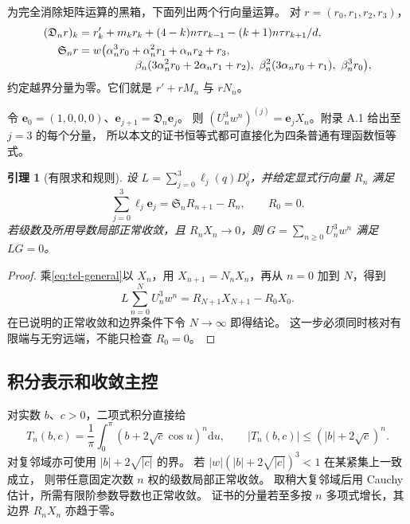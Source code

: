 \documentclass[11pt,a4paper]{article}
\numberwithin{equation}{section}
\newtheorem{lemma}[theorem]{引理}
\theoremstyle{remark}\newtheorem{remark}[theorem]{说明}
\newcommand{\dd}{\mathrm d}
\newcommand{\ee}{\boldsymbol e}
\newcommand{\Dop}{\mathfrak D}
\newcommand{\Sop}{\mathfrak S}
\begin{document}
为完全消除矩阵运算的黑箱，下面列出两个行向量运算。
对 $r=(r_0,r_1,r_2,r_3)$，
\begin{align}
 (\Dop_nr)_k&=r_k'+m_kr_k+(4-k)n\tau r_{k-1}
                    -(k+1)n\tau r_{k+1}/d,\label{eq:Drow}\\
 \Sop_nr&=w\bigl(\alpha_n^3r_0+\alpha_n^2r_1+\alpha_nr_2+r_3,\notag\\[-0.3em]
 &\hspace{18mm}\beta_n(3\alpha_n^2r_0+2\alpha_nr_1+r_2),\
 \beta_n^2(3\alpha_nr_0+r_1),\ \beta_n^3r_0\bigr),\label{eq:Srow}
\end{align}
约定越界分量为零。它们就是 $r'+rM_n$ 与 $rN_n$。

令 $\ee_0=(1,0,0,0)$、$\ee_{j+1}=\Dop_n\ee_j$。
则 $(U_n^3w^n)^{(j)}=\ee_jX_n$。附录 A.1 给出至 $j=3$ 的每个分量，
所以本文的证书恒等式都可直接化为四条普通有理函数恒等式。

\begin{lemma}[有限求和规则]\label{lem:tel}
设 $L=\sum_{j=0}^3\ell_j(q)D_q^j$，并给定显式行向量 $R_n$ 满足
\begin{equation}\label{eq:tel-general}
 \sum_{j=0}^3\ell_j\ee_j=\Sop_nR_{n+1}-R_n,\qquad R_0=0.
\end{equation}
若级数及所用导数局部正常收敛，且 $R_nX_n\to0$，则
$G=\sum_{n\ge0}U_n^3w^n$ 满足 $LG=0$。
\end{lemma}
\begin{proof}
乘\eqref{eq:tel-general}以 $X_n$，用 $X_{n+1}=N_nX_n$，再从 $n=0$ 加到 $N$，得到
\[
 L\sum_{n=0}^NU_n^3w^n=R_{N+1}X_{N+1}-R_0X_0.
\]
在已说明的正常收敛和边界条件下令 $N\to\infty$ 即得结论。
这一步必须同时核对有限端与无穷远端，不能只检查 $R_0=0$。
\end{proof}

\subsection{积分表示和收敛主控}
对实数 $b$、$c>0$，二项式积分直接给
\begin{equation}\label{eq:Uint}
 T_n(b,c)=\frac1\pi\int_0^\pi(b+2\sqrt c\cos u)^n\dd u,
 \qquad |T_n(b,c)|\le(|b|+2\sqrt c)^n.
\end{equation}
对复邻域亦可使用 $|b|+2\sqrt{|c|}$ 的界。
若 $|w|(|b|+2\sqrt{|c|})^3<1$ 在某紧集上一致成立，
则带任意固定次数 $n$ 权的级数局部正常收敛。
取稍大复邻域后用 Cauchy 估计，所需有限阶参数导数也正常收敛。
证书的分量若至多按 $n$ 多项式增长，其边界 $R_nX_n$ 亦趋于零。
\end{document}
